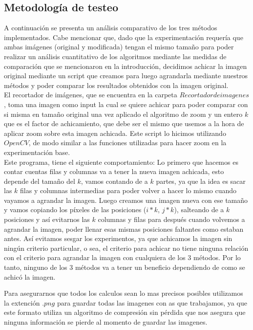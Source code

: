 \subsection{Metodología de testeo}
A continuación se presenta un análisis comparativo de los tres métodos implementados.
Cabe mencionar que, dado que la experimentación requería que ambas imágenes (original y modificada) tengan el mismo tamaño para poder realizar un análisis cuantitativo de los algoritmos mediante las medidas de comparación que se mencionaron en la introducción, decidimos achicar la imagen original mediante un script que creamos para luego agrandarla mediante nuestros métodos y poder comparar los resultados obtenidos con la imagen original.
\\
El recortador de imágenes, que se encuentra en la carpeta $Recortador de imagenes$, toma una imagen como input la cual se quiere achicar para poder comparar con si misma en tamaño original una vez aplicado el algoritmo de zoom y un entero $k$ que es el factor de achicamiento, que debe ser el mismo que usemos a la hora de aplicar zoom sobre esta imagen achicada. Este script lo hicimos utilizando $OpenCV$, de modo similar a las funciones utilizadas para hacer zoom en la experimentación base.
\\ 
Este programa, tiene el siguiente comportamiento:
Lo primero que hacemos es contar cuentas filas y columnas va a tener la nueva imagen achicada, esto depende del tamaño del $k$, vamos contando de a $k$ partes, ya que la idea es sacar las $k$ filas y columnas intermedias para poder volver a hacer lo mismo cuando vayamos a agrandar la imagen. Luego creamos una imagen nueva con ese tamaño y vamos copiando los píxeles de las posiciones ($i*k$, $j*k$), salteando de a $k$ posiciones y así evitarnos las $k$ columnas y filas para después cuando volvemos a agrandar la imagen, poder llenar esas mismas posiciones faltantes como estaban antes. Así evitamos sesgar los experimentos, ya que achicamos la imagen sin ningún criterio particular, o sea, el criterio para achicar no tiene ninguna relación con el criterio para agrandar la imagen con cualquiera de los 3 métodos. Por lo tanto, ninguno de los $3$ métodos va a tener un beneficio dependiendo de como se achicó la imagen.   

Para asegurarnos que todos los calculos sean lo mas precisos posibles utilizamos la extención $.png$ para guardar todas las imagenes con as que trabajamos, ya que este formato utiliza un algoritmo de compresión sin pérdida que nos asegura que ninguna información se pierde al momento de guardar las imagenes.

